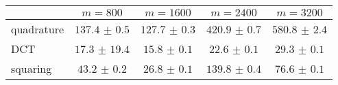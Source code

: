 \centering
\renewcommand{\arraystretch}{1.2}
\begin{tabular}{@{}lcccc@{}}
\toprule
 & $m=800$ & $m=1600$ & $m=2400$ & $m=3200$\\
\midrule
quadrature & $137.4$ $\pm$ $0.5$ & $127.7$ $\pm$ $0.3$ & $420.9$ $\pm$ $0.7$ & $580.8$ $\pm$ $2.4$ \\
DCT & $17.3$ $\pm$ $19.4$ & $15.8$ $\pm$ $0.1$ & $22.6$ $\pm$ $0.1$ & $29.3$ $\pm$ $0.1$ \\
squaring & $43.2$ $\pm$ $0.2$ & $26.8$ $\pm$ $0.1$ & $139.8$ $\pm$ $0.4$ & $76.6$ $\pm$ $0.1$ \\
\bottomrule
\end{tabular}
